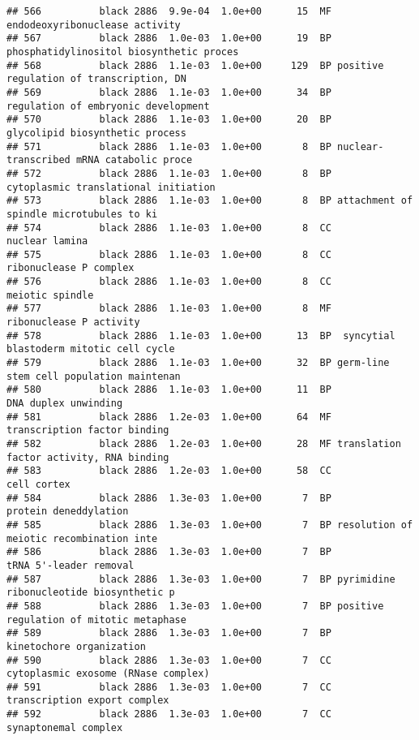 \documentclass[]{article}
\begin{document}
\begin{verbatim}
## 566          black 2886  9.9e-04  1.0e+00      15  MF           endodeoxyribonuclease activity
## 567          black 2886  1.0e-03  1.0e+00      19  BP phosphatidylinositol biosynthetic proces
## 568          black 2886  1.1e-03  1.0e+00     129  BP positive regulation of transcription, DN
## 569          black 2886  1.1e-03  1.0e+00      34  BP      regulation of embryonic development
## 570          black 2886  1.1e-03  1.0e+00      20  BP          glycolipid biosynthetic process
## 571          black 2886  1.1e-03  1.0e+00       8  BP nuclear-transcribed mRNA catabolic proce
## 572          black 2886  1.1e-03  1.0e+00       8  BP     cytoplasmic translational initiation
## 573          black 2886  1.1e-03  1.0e+00       8  BP attachment of spindle microtubules to ki
## 574          black 2886  1.1e-03  1.0e+00       8  CC                           nuclear lamina
## 575          black 2886  1.1e-03  1.0e+00       8  CC                   ribonuclease P complex
## 576          black 2886  1.1e-03  1.0e+00       8  CC                          meiotic spindle
## 577          black 2886  1.1e-03  1.0e+00       8  MF                  ribonuclease P activity
## 578          black 2886  1.1e-03  1.0e+00      13  BP  syncytial blastoderm mitotic cell cycle
## 579          black 2886  1.1e-03  1.0e+00      32  BP germ-line stem cell population maintenan
## 580          black 2886  1.1e-03  1.0e+00      11  BP                     DNA duplex unwinding
## 581          black 2886  1.2e-03  1.0e+00      64  MF             transcription factor binding
## 582          black 2886  1.2e-03  1.0e+00      28  MF translation factor activity, RNA binding
## 583          black 2886  1.2e-03  1.0e+00      58  CC                              cell cortex
## 584          black 2886  1.3e-03  1.0e+00       7  BP                    protein deneddylation
## 585          black 2886  1.3e-03  1.0e+00       7  BP resolution of meiotic recombination inte
## 586          black 2886  1.3e-03  1.0e+00       7  BP                   tRNA 5'-leader removal
## 587          black 2886  1.3e-03  1.0e+00       7  BP pyrimidine ribonucleotide biosynthetic p
## 588          black 2886  1.3e-03  1.0e+00       7  BP positive regulation of mitotic metaphase
## 589          black 2886  1.3e-03  1.0e+00       7  BP                 kinetochore organization
## 590          black 2886  1.3e-03  1.0e+00       7  CC      cytoplasmic exosome (RNase complex)
## 591          black 2886  1.3e-03  1.0e+00       7  CC             transcription export complex
## 592          black 2886  1.3e-03  1.0e+00       7  CC                     synaptonemal complex

\end{verbatim}
\end{document}
